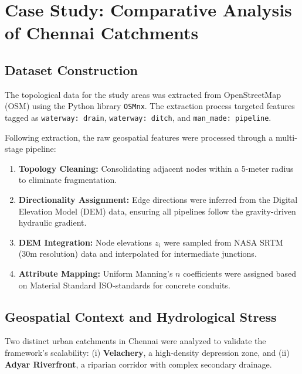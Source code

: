 \documentclass[conference]{IEEEtran}
\begin{document}
\section{Case Study: Comparative Analysis of Chennai Catchments}
\subsection{Dataset Construction}
The topological data for the study areas was extracted from OpenStreetMap (OSM) using the Python library \texttt{OSMnx}. The extraction process targeted features tagged as \texttt{waterway: drain}, \texttt{waterway: ditch}, and \texttt{man\_made: pipeline}. 

Following extraction, the raw geospatial features were processed through a multi-stage pipeline:
\begin{enumerate}
    \item \textbf{Topology Cleaning:} Consolidating adjacent nodes within a 5-meter radius to eliminate fragmentation.
    \item \textbf{Directionality Assignment:} Edge directions were inferred from the Digital Elevation Model (DEM) data, ensuring all pipelines follow the gravity-driven hydraulic gradient.
    \item \textbf{DEM Integration:} Node elevations $z_i$ were sampled from NASA SRTM (30m resolution) data and interpolated for intermediate junctions.
    \item \textbf{Attribute Mapping:} Uniform Manning's $n$ coefficients were assigned based on Material Standard ISO-standards for concrete conduits.
\end{enumerate}

\subsection{Geospatial Context and Hydrological Stress}
Two distinct urban catchments in Chennai were analyzed to validate the framework's scalability: (i) \textbf{Velachery}, a high-density depression zone, and (ii) \textbf{Adyar Riverfront}, a riparian corridor with complex secondary drainage. 
\end{document}
